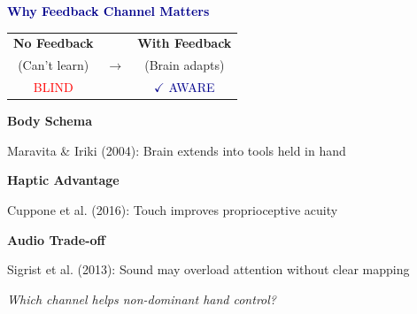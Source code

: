 \documentclass{beamer}
\begin{document}
\begin{frame}[plain]
  \vspace{0.5cm}
  \centering

  \textcolor{darkblue}{\Large \textbf{Why Feedback Channel Matters}}

  \vspace{0.5cm}

  \begin{tabular}{c c c}
    \textbf{No Feedback} & & \textbf{With Feedback} \\
    (Can't learn) & $\longrightarrow$ & (Brain adapts) \\
    \textcolor{red}{BLIND} & & \textcolor{darkblue}{$\checkmark$ AWARE}
  \end{tabular}

  \vspace{0.6cm}

  \textbf{\small Body Schema}

  {\small Maravita \& Iriki (2004): Brain extends into tools held in hand}

  \vspace{0.35cm}

  \textbf{\small Haptic Advantage}

  {\small Cuppone et al. (2016): Touch improves proprioceptive acuity}

  \vspace{0.35cm}

  \textbf{\small Audio Trade-off}

  {\small Sigrist et al. (2013): Sound may overload attention without clear mapping}

  \vspace{0.5cm}

  {\small \textit{Which channel helps non-dominant hand control?}}
\end{frame}
\end{document}
